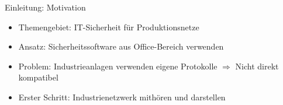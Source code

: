 \begin{frame}{Einleitung: Motivation}
    \begin{itemize}[<+->]
      \item Themengebiet: IT-Sicherheit für Produktionsnetze
      \item Ansatz: Sicherheitssoftware aus Office-Bereich verwenden
      \item Problem: Industrieanlagen verwenden eigene Protokolle
            \newline $\Rightarrow$ Nicht direkt kompatibel
      \item Erster Schritt: Industrienetzwerk mithören und darstellen
    \end{itemize}
\end{frame} 